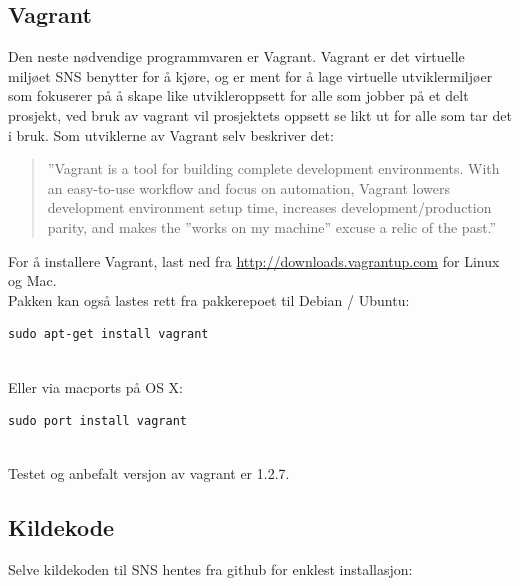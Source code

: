 \documentclass{article}
\begin{document}
\subsection{Vagrant}
Den neste nødvendige programmvaren er Vagrant. Vagrant er det virtuelle miljøet SNS benytter for å kjøre, og er ment for å lage virtuelle utviklermiljøer som fokuserer på å skape like utvikleroppsett for alle som jobber på et delt prosjekt, ved bruk av vagrant vil prosjektets oppsett se likt ut for alle som tar det i bruk. Som utviklerne av Vagrant selv beskriver det: 
\begin{quote}
''Vagrant is a tool for building complete development environments. With an easy-to-use workflow and focus on automation, Vagrant lowers development environment setup time, increases development/production parity, and makes the ''works on my machine'' excuse a relic of the past.''
\end{quote}
For å installere Vagrant, last ned fra \url{http://downloads.vagrantup.com} for Linux og Mac. \\
 Pakken kan også lastes rett fra pakkerepoet til Debian / Ubuntu: \\ 
\begin{lstlisting}
sudo apt-get install vagrant
\end{lstlisting}
\\
Eller via macports på OS X:
\begin{lstlisting}
sudo port install vagrant
\end{lstlisting}
\\
Testet og anbefalt versjon av vagrant er 1.2.7. 
\subsection{Kildekode}
Selve kildekoden til SNS hentes fra github for enklest installasjon: 
\end{document}
